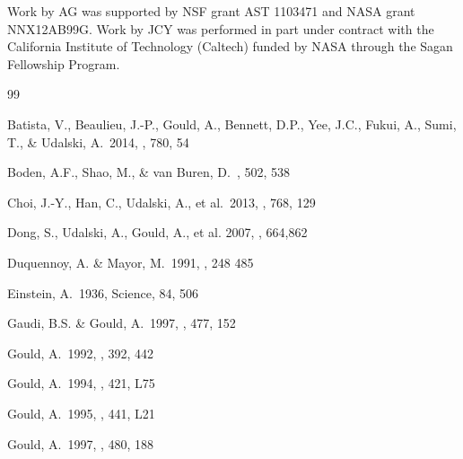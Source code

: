 \documentclass[12pt,preprint]{aastex}
\begin{document}
\acknowledgments

Work by AG was supported by NSF grant AST 1103471 
and NASA grant NNX12AB99G.  Work by JCY was performed in part under 
contract with the California Institute of Technology (Caltech) funded 
by NASA through the Sagan Fellowship Program.




\begin{thebibliography}{99}



 Batista, V., Beaulieu, J.-P.,
Gould, A., Bennett, D.P., Yee, J.C., Fukui, A., Sumi, T., \& Udalski, A.\
2014, \apj, 780, 54

 Boden, A.F., Shao, M., \& van Buren, D.\
\apj, 502, 538

  Choi, J.-Y., Han, C., Udalski, A., et 
al.\ 2013, \apj, 768, 129


\bibitem[Dong et al.(2007)]{dong07} Dong, S., Udalski, A., Gould, A., 
et al. 2007, \apj, 664,862

 Duquennoy, A. \& Mayor, M.\ 1991,
\aap, 248 485

 Einstein, A.\ 1936, Science, 84, 506 


Gaudi, B.S. \& Gould, A.\ 1997, \apj, 477, 152

 Gould, A.\ 1992, \apj, 392, 442

 Gould, A.\ 1994, \apj, 421, L75

 Gould, A.\ 1995, \apj, 441, L21

 Gould, A.\ 1997, \apj, 480, 188


\end{thebibliography}
\end{document}
